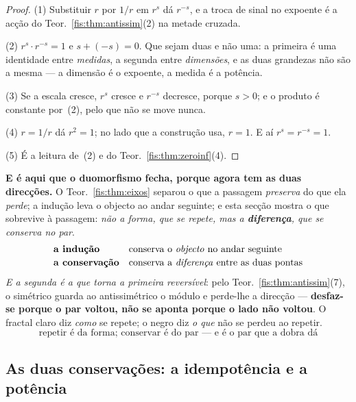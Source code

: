\documentclass[livro.tex]{subfiles}
\begin{document}
\begin{proof}
(1) Substituir $r$ por $1/r$ em $r^{s}$ dá $r^{-s}$, e a troca de sinal no
expoente é a acção do Teor.~\ref{fis:thm:antissim}(2) na metade cruzada.

(2) $r^{s}\cdot r^{-s}=1$ e $s+(-s)=0$. Que sejam duas e não uma: a primeira é
uma identidade entre \emph{medidas}, a segunda entre \emph{dimensões}, e as duas
grandezas não são a mesma --- a dimensão é o expoente, a medida é a potência.

(3) Se a escala cresce, $r^{s}$ cresce e $r^{-s}$ decresce, porque $s>0$; e o
produto é constante por~(2), pelo que não se move nunca.

(4) $r=1/r$ dá $r^{2}=1$; no lado que a construção usa, $r=1$. E aí
$r^{s}=r^{-s}=1$.

(5) É a leitura de~(2) e do Teor.~\ref{fis:thm:zeroinf}(4).
\end{proof}


\medskip\noindent\textbf{E é aqui que o duomorfismo fecha, porque agora tem as
duas direcções.} O Teor.~\ref{fis:thm:eixos} separou o que a passagem
\emph{preserva} do que ela \emph{perde}; a indução leva o objecto ao andar
seguinte; e esta secção mostra o que sobrevive à passagem: \emph{não a forma, que
se repete, mas a \textbf{diferença}, que se conserva no par}.
\[
\begin{array}{ll}
\textbf{a indução} & \text{conserva o \emph{objecto} no andar seguinte}\\[2pt]
\textbf{a conservação} & \text{conserva a \emph{diferença} entre as duas pontas}
\end{array}
\]
\emph{E a segunda é a que torna a primeira reversível}: pelo
Teor.~\ref{fis:thm:antissim}(7), o simétrico guarda ao antissimétrico o módulo e
perde-lhe a direcção --- \textbf{desfaz-se porque o par voltou, não se aponta
porque o lado não voltou}. O fractal claro diz \emph{como} se repete; o negro diz
\emph{o que} não se perdeu ao repetir.
\[
\boxed{\;\text{repetir é da forma; conservar é do par --- e é o par que a dobra dá}\;}
\]

\subsection*{As duas conservações: a idempotência e a potência}
\end{document}
